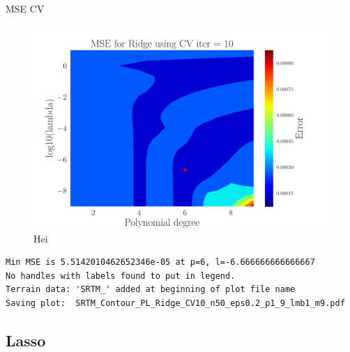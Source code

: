 \documentclass[reprint,english,notitlepage,aps,nobalancelastpage,nofootinbib]{revtex4-1}  %
\begin{document}
MSE CV
\begin{figure}[H]
	\includegraphics[width=\linewidth]{SRTM_Contour_PL_Ridge_CV10_n50_eps0.2_p1_9_lmb1_m9.pdf}
	\caption{Hei}
	\label{fig:terrain_Ridge_MSE_CV}
\end{figure}
\begin{verbatim}
Min MSE is 5.5142010462652346e-05 at p=6, l=-6.666666666666667
No handles with labels found to put in legend.
Terrain data: 'SRTM_' added at beginning of plot file name
Saving plot:  SRTM_Contour_PL_Ridge_CV10_n50_eps0.2_p1_9_lmb1_m9.pdf
\end{verbatim}

\subsection*{Lasso}
\end{document}
